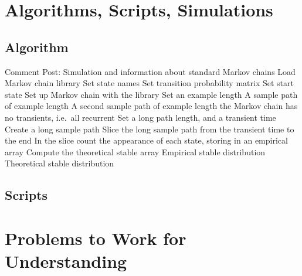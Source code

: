 \documentclass[12pt]{article}
\begin{document}
\hr

\section*{Algorithms, Scripts, Simulations}

\subsection*{Algorithm}
\begin{codebox}
  \zi Comment Post: Simulation and information about standard Markov
  chains
  \li Load Markov chain library
  \li Set state names
  \li Set transition probability matrix
  \li Set start state
  \li Set up Markov chain with the library
  \li Set an example length
  \li \Return A sample path of example length
  \li \Return A second sample path of example length
  \li \If the Markov chain has no transients, i.e.\  all recurrent 
  \li     Set a long path length, and a transient time
  \li     Create a long sample path
  \li     Slice the long sample path from the transient time to the end
  \li     In the slice count the appearance of each state, storing in an empirical
  array
  \li     Compute the theoretical stable array
  \li     \Return Empirical stable distribution
  \li     \Return Theoretical stable distribution
\end{codebox}
\subsection*{Scripts}



\hr

\section*{Problems to Work for Understanding}

\renewcommand{\theexerciseseries}{}
\renewcommand{\theexercise}{\arabic{exercise}}
\end{document}
